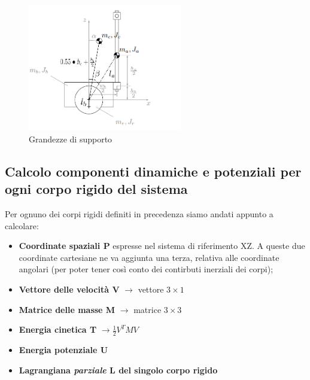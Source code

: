 \begin{figure}[h]
	\centering   	
	\includegraphics[width=0.6\textwidth]{Immagini/VAB_additionalMeasures.png}
	\caption{Grandezze di supporto}
	\label{fig:VAB_lunghezze}
\end{figure}

\subsection{Calcolo componenti dinamiche e potenziali per ogni corpo rigido del sistema}
Per ognuno dei corpi rigidi definiti in precedenza siamo andati appunto a calcolare:

\begin{itemize}
	\item \textbf{Coordinate spaziali P} espresse nel sistema di riferimento XZ. A queste due coordinate cartesiane ne va aggiunta una terza, relativa alle coordinate angolari (per poter tener così conto dei contirbuti inerziali dei corpi);
	\item \textbf{Vettore delle velocità V} $\rightarrow$ vettore $3\times 1$
	\item \textbf{Matrice delle masse M} $\rightarrow$ matrice $3\times 3$
	\item \textbf{Energia cinetica T} $\rightarrow \frac{1}{2} V^T M V$
	\item \textbf{Energia potenziale U}
	\item \textbf{Lagrangiana \textit{parziale} L del singolo corpo rigido}
\end{itemize}

